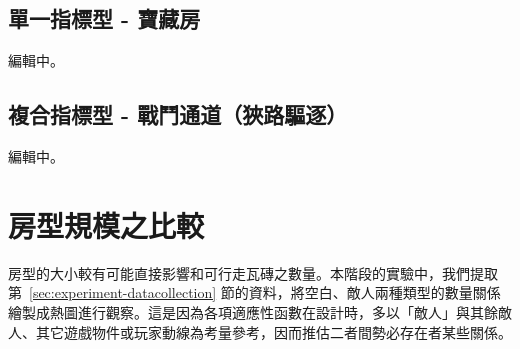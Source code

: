 \subsection{單一指標型 - 寶藏房}
\label{ssec:experiment-normalized-treasure}

編輯中。

\subsection{複合指標型 - 戰鬥通道（狹路驅逐）}
\label{ssec:experiment-normalized-narrow}

編輯中。

\section{房型規模之比較}
\label{sec:experiment-density}

房型的大小較有可能直接影響和可行走瓦磚之數量。本階段的實驗中，我們提取第~\ref{sec:experiment-datacollection} 節的資料，將空白、敵人兩種類型的數量關係繪製成熱圖進行觀察。這是因為各項適應性函數在設計時，多以「敵人」與其餘敵人、其它遊戲物件或玩家動線為考量參考，因而推估二者間勢必存在者某些關係。


